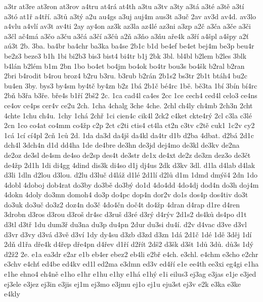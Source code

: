 {a3tr
at3re
at3ron
at3rov
a4tru
at4r\'a
at4th
a3tu
a3tv
a3ty
a3t\'a
a3t\'e
a3t\v e
a3t\'i
a3t\'o
at1\v r
a4t\v r\'i.
a3t\r u
a3t\'y
a2u
au4gs
a3uj
auj4m
aus3t
a3u\v c
2av
av3d
av4d.
av3lo
a4vlu
a4vl\'i
av3t
av4ti
2ay
ay4on
az3k
az3la
az4l\'e
az3ni
a3zp
a2\v c
a3\v ca
a3\v ce
a3\v ci
a3\v cl
a\v c4m\'a
a3\v co
a3\v cu
a3\v c\'a
a3\v c\'i
a3\v c\r u
a2\v n
a3\v no
a3\v nu
a\v re4k
a3\v r\'i
a4\v spl
a4\v spy
a2\v t
a\'u3t
2b.
3ba.
ba4br
ba4chr
ba3ka
ba4se
2b1c
b1d
be4ef
be4et
bej4m
be3p
beu4r
be2z3
beze3
b1h
1bi
bi2b3
bis3
bist4
bi4tr
b1j
2bk
3bl.
bl4bl
b2lem
b2les
3blk
b4l\'an
b2l\'em
b1m
2bn
1bo
bo4et
bo4jm
bo4ok
bo4tr
bou3s
bo4\v sk
b2ral
b2ran
2bri
b4rodit
b4rou
broz4
b2ru
b3ru.
b3rub
b2r\'an
2b1s2
bs3tr
2b1t
bt\'ah4
bu2c
bu4en
3by.
bys3
by4sm
by4t\v c
by4zn
b2z
1b\'a
2b1\v c
b\'e4rc
1b\v e.
b\v e3ta
1b\'i
3b\'in
b\'i4rc
2b\v n
b3\v ra
b3\v re.
b\v re4s
b1\v r\'i
2b\v s2
2c.
1ca
cad4l
ca4es
2cc
1ce
cech4
ced4l
celo3
ce4ns
ce4ov
ce4ps
cer4v
ce2u
2ch.
1cha
4chalg
3che
4che.
2chl
ch4ly
ch4mb
2ch3n
2cht
4chte
1chu
ch4u.
1chy
1ch\'a
2ch\v r
1ci
cien4c
cik4l
2ck2
c4ket
ckte4r\'y
2cl
c3la
c3l\'e
2cn
1co
co4at
co4mm
co4\v zp
c2p
2ct
c2ti
ctis4
ct4la
ct2n
c3tv
c2t\v e
cuk1
1c2v
cy2
1c\'a
1c\'i
c\'i4pl
2c\v n
1c\r u
2d.
1da
da3d
da4j\v s
da4kl
da4tr
d1b
d2ba
4dbat.
d2b\'a
2d1c
dch4l
3dch4n
d1d
dd4ha
1de
de4bre
de3hn
de3jd
dej4mo
de3kl
de3kv
de2na
de2oz
de3sl
de4sm
de4so
de2sp
des4t
de3str
de1x
de4xt
de2z
de3zn
dez3o
de3\v ct
de4\v zp
2d1h
1di
di4gg
4dind
dis3k
di4so
d1j
dj4us
2dk
d3kv
3dl.
d1la
d4lab
d4lak
d3li
1dln
d2lou
d3lou.
d2lu
d3lu\v c
d4l\'a\v z
d1l\'e
2d1l\'i
d2l\r u
d1m
1dmd
dm\'y\v s4
2dn
1do
4dobl
4doboj
dob4rat
do3by
do3b\v e
do3b\'y
do1d
4do4dd
4do4dj
dod4n
do3h
doj4m
4dokn
4doly
do3mn
domoh4
do3p
do4pc
dop4n
dor2v
do1s
dos4p
dos4tiv
do3t
do3uk
do3u\v c
do3z2
doz4n
do3\v c
4do4\v cn
do\v c4t
do4\v zp
4dran
d4rap
d1re
d4ren
3drobn
d3ros
d3rou
d3ro\v s
dr4sc
d3ru\v s
d3r\'e
d3r\'y
d4r\'yv
2d1s2
ds4k\r u
ds4po
d1t
d3tl
d3t\v r
1du
dum3\v r
du3na
du3p
du4pn
2dur
du3si
du4\'i.
d2v
d4vac
d3ve
d3vl
d3vr
d3vy
d3v\'a
d3v\v e
d3v\'i
1dy
dy4su
d3zb
d3zd
d3zn
1d\'a
2d1\v c
1d\'e
1d\v e
3d\v ej
1d\'i
2d\v n
d1\v ra
d\v re4k
d4\v rep
d\v re4pn
d4\v rev
d1\v r\'i
d2\v r\'it
2d\v s2
d3\v sk
d3\v st
1d\r u
3d\r u.
d\r u3s
1d\'y
d2\v z2
2e.
e1a
ea3dr
e2ar
e1b
eb4er
ebez2
eb4li
e2b\v r
e4ch.
e3chl.
e4chm
e3cho
e2chr
e3chv
e4ch\v t
ed4be
ed4kv
ed1l
ed2ma
e3dmn
ed3v
ed4\v r\'i
e1e
ee4th
ee3xi
eg4gi
e1ha
e1he
ehno4
eh4n\v e
e1ho
e1hr
e1hu
e1hy
e1h\'a
e1h\'y
e1i
eilus3
ej3ag
e3jas
e1je
e3jed
ej3ele
e3jez
ej3in
e3jis
ej1m
ej3mo
e3jmu
ej1o
ej1u
eju3st
ej3v
e2k
e3ka
e3ke
e4kly
}
